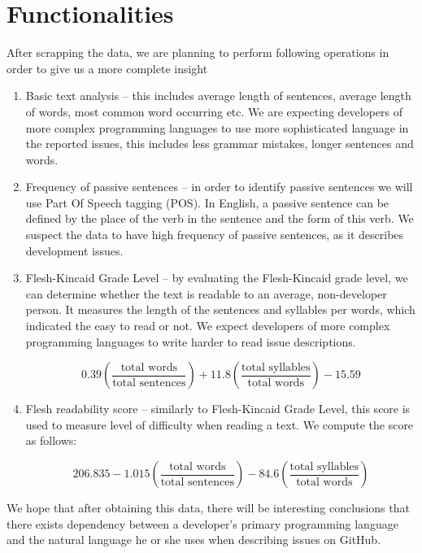 \documentclass[]{article}
\begin{document}
\section{Functionalities}

After scrapping the data, we are planning to perform following operations in order to give us a more complete insight

\begin{enumerate}
    \item Basic text analysis -- this includes average length of sentences, average length of words, most common word occurring etc. We are expecting developers of more complex programming languages to use more sophisticated language in the reported issues, this includes less grammar mistakes, longer sentences and words.

    \item Frequency of passive sentences -- in order to identify passive sentences we will use Part Of Speech tagging (POS). In English, a passive sentence can be defined by the place of the verb in the sentence and the form of this verb. We suspect the data to have high frequency of passive sentences, as it describes development issues.

    \item Flesh-Kincaid Grade Level -- by evaluating the Flesh-Kincaid grade level, we can determine whether the text is readable to an average, non-developer person. It measures the length of the sentences and syllables per words, which indicated the easy to read or not. We expect developers of more complex programming languages to write harder to read issue descriptions.

          \[0.39\left(\frac{\text{total words}}{\text{total sentences}}\right) + 11.8\left(\frac{\text{total syllables}}{\text{total words}}\right) - 15.59\]

    \item Flesh readability score -- similarly to Flesh-Kincaid Grade Level, this score is used to measure level of difficulty when reading a text. We compute the score as follows:

          \[206.835 - 1.015\left(\frac{\text{total words}}{\text{total sentences}}\right) - 84.6\left(\frac{\text{total syllables}}{\text{total words}}\right)\]
\end{enumerate}

We hope that after obtaining this data, there will be interesting conclusions that there exists dependency between a developer's primary programming language and the natural language he or she uses when describing issues on GitHub.
\end{document}
